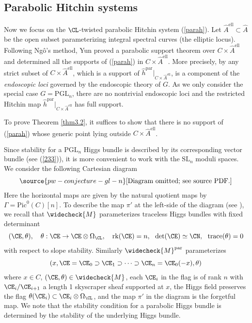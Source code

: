 \subsection{Parabolic Hitchin systems}
Now we focus on the $\CL$-twisted parabolic Hitchin system (\ref{parah}). Let $\widehat{A}^{\mathrm{ell}} \subset \widehat{A}$ be the open subset parameterizing integral spectral curves (the elliptic locus). Following Ng\^o's method, Yun \cite{Yun2,Yun3} proved a parabolic support theorem over $C \times \widehat{A}^{\mathrm{ell}}$ and determined all the supports of (\ref{parah}) in $C \times \widehat{A}^\mathrm{ell}$. More precisely, by \cite[Section 2]{Yun3} any strict subset of $C \times \widehat{A}^{\mathrm{ell}}$, which is a support of $\widehat{h}^{\mathrm{par}}|_{C \times \widehat{A}^{\mathrm{ell}}}$, is a component of the \emph{endoscopic loci} governed by the endoscopic theory of $G$. As we only consider the special case $G = \mathrm{PGL}_n$, there are no nontrivial endoscopic loci and the restricted Hitchin map $\widehat{h}^{\mathrm{par}}|_{C \times \widehat{A}^{\mathrm{ell}}}$ has full support.

To prove Theorem \ref{thm3.2}, it suffices to show that there is no support of (\ref{parah}) whose generic point lying outside $C \times \widehat{A}^{\mathrm{ell}}$.

Since stability for a $\mathrm{PGL}_n$ Higgs bundle is described by its corresponding vector bundle (see (\ref{233})), it is more convenient to work with the $\mathrm{SL}_n$ moduli spaces. We consider the following Cartesian diagram
\begin{equation}\label{diag321}
\source{pw-conjecture-gl-n}
\text{[Diagram omitted; see source PDF.]}
\end{equation}
Here the horizontal maps are given by the natural quotient maps by $\Gamma = \mathrm{Pic}^0(C)[n]$. To describe the map $\pi'$ at the left-side of the diagram (see \cite[Example 2.2.5]{Yun1}),  we recall that $\widecheck{M}$ parameterizes traceless Higgs bundles with fixed determinant
\[
(\CE, \theta) , \quad \theta: \CE \to \CE\otimes \Omega_\CL, \quad \mathrm{rk}(\CE) = n, ~~\mathrm{det}(\CE) \simeq \CN,~~ \mathrm{trace}(\theta) = 0
\]
with respect to slope stability. Similarly $\widecheck{M}^{\mathrm{par}}$ parameterizes
\[
(x, \CE = \CE_0 \supset \CE_1 \supset \cdots \supset \CE_n =  \CE_0(-x), \theta)
\]
where $x\in C$, $(\CE, \theta) \in \widecheck{M}$, each $\CE_i$ in the flag is of rank $n$ with $\CE_i/\CE_{i+1}$ a length 1 skyscraper sheaf supported at $x$, the Higgs field preserves the flag $\theta(\CE_i) \subset \CE_i\otimes \Omega_\CL$, and the map $\pi'$ in the diagram is the forgetful map. We note that the stability condition for a parabolic Higgs bundle is determined by the stability of the underlying Higgs bundle.

